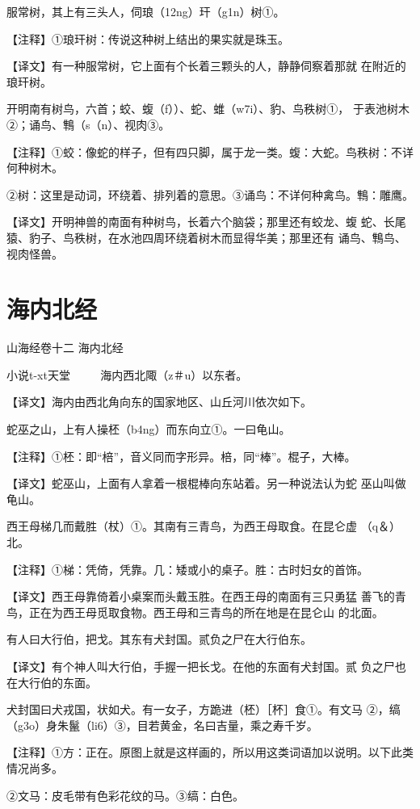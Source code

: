 \documentclass[a4paper,12pt,UTF8,twoside]{ctexbook}
\begin{document}
服常树，其上有三头人，伺琅（12ng）玕（g1n）树①。

【注释】①琅玕树：传说这种树上结出的果实就是珠玉。

【译文】有一种服常树，它上面有个长着三颗头的人，静静伺察着那就 在附近的琅玕树。

开明南有树鸟，六首；蛟、蝮（f））、蛇、蜼（w7i）、豹、鸟秩树①， 于表池树木②；诵鸟、鶽（s（n）、视肉③。

【注释】①蛟：像蛇的样子，但有四只脚，属于龙一类。蝮：大蛇。鸟秩树：不详何种树木。

②树：这里是动词，环绕着、排列着的意思。③诵鸟：不详何种禽鸟。鶽：雕鹰。

【译文】开明神兽的南面有种树鸟，长着六个脑袋；那里还有蛟龙、蝮 蛇、长尾猿、豹子、鸟秩树，在水池四周环绕着树木而显得华美；那里还有 诵鸟、鶽鸟、视肉怪兽。

\chapter{海内北经}

山海经卷十二 海内北经

小说t-xt天堂　  　
海内西北陬（z＃u）以东者。

【译文】海内由西北角向东的国家地区、山丘河川依次如下。

蛇巫之山，上有人操柸（b4ng）而东向立①。一曰龟山。

【注释】①柸：即“棓”，音义同而字形异。棓，同“棒”。棍子，大棒。

【译文】蛇巫山，上面有人拿着一根棍棒向东站着。另一种说法认为蛇 巫山叫做龟山。

西王母梯几而戴胜（杖）①。其南有三青鸟，为西王母取食。在昆仑虚 （q＆）北。

【注释】①梯：凭倚，凭靠。几：矮或小的桌子。胜：古时妇女的首饰。

【译文】西王母靠倚着小桌案而头戴玉胜。在西王母的南面有三只勇猛 善飞的青鸟，正在为西王母觅取食物。西王母和三青鸟的所在地是在昆仑山 的北面。

有人曰大行伯，把戈。其东有犬封国。贰负之尸在大行伯东。

【译文】有个神人叫大行伯，手握一把长戈。在他的东面有犬封国。贰 负之尸也在大行伯的东面。

犬封国曰犬戎国，状如犬。有一女子，方跪进（柸）［杯］食①。有文马 ②，缟（g3o）身朱鬣（li6）③，目若黄金，名曰吉量，乘之寿千岁。

【注释】①方：正在。原图上就是这样画的，所以用这类词语加以说明。以下此类情况尚多。

②文马：皮毛带有色彩花纹的马。③缟：白色。
\end{document}
